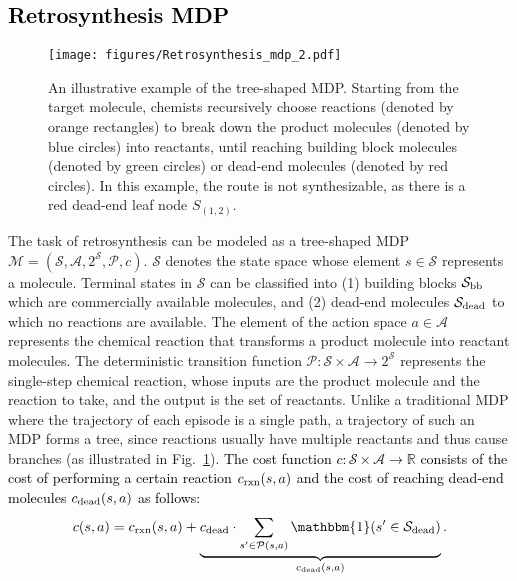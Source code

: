 \documentclass[nohyperref]{article}
\theoremstyle{plain}
\theoremstyle{definition}
\theoremstyle{remark}
\begin{document}
\subsection{\textcolor{black}{Retrosynthesis MDP}}\label{sec:formulation}





\begin{figure}[t]
\centerline{\texttt{[image: figures/Retrosynthesis\_mdp\_2.pdf]}}
\caption{
An illustrative example of the tree-shaped MDP. 
Starting from the target molecule, chemists recursively choose reactions (denoted by orange rectangles) to break down the product molecules (denoted by blue circles) into reactants, until reaching building block molecules (denoted by green circles) or dead-end molecules (denoted by red circles).
In this example, the route is not synthesizable, as there is a red dead-end leaf node $S_{(1,2)}$. 
}
\label{fig:mdp}
\end{figure}


The task of retrosynthesis can be modeled as a 
tree-shaped MDP $\mathcal{M} = (\mathcal{S}, \mathcal{A}, 2^\mathcal{S}, \mathcal{P}, c)$.
$\mathcal{S}$ denotes the state space whose element $s\in\mathcal{S}$ represents a molecule. Terminal states in $\mathcal{S}$ can be classified into (1) building blocks $\mathcal{S}_{\rm bb}$ which are commercially available molecules, and (2) dead-end molecules $\mathcal{S}_{\rm dead}$ to which no reactions are available. 
The element of the action space $a\in\mathcal{A}$ represents the chemical reaction that transforms a product molecule into reactant molecules. 
The deterministic transition function $\mathcal{P}: \mathcal{S}\times\mathcal{A}\rightarrow 2^\mathcal{S}$ represents the single-step chemical reaction, whose inputs are the product molecule and the reaction to take, and the output is the set of reactants. 
Unlike a traditional MDP 
where the trajectory
of each episode is a single path,
a trajectory of such an MDP forms a tree, since reactions usually have multiple reactants and thus cause branches (as illustrated in Fig.~\ref{fig:mdp}).
\textcolor{black}{The cost function $c: \mathcal{S}\times\mathcal{A}
\rightarrow \mathbb{R}$ consists of the cost of performing a certain reaction $c_{\rm rxn}(s,a)$ and the cost of
reaching dead-end molecules $c_{\rm dead}(s,a)$ as follows:
}
\begin{equation}
c(s,a) = c_{\rm rxn}(s,a) + \underbrace{c_{\rm dead} \cdot \sum_{s' \in \mathcal{P}(s,a)}{ \mathbbm{1}(s' \in \mathcal{S}_{\rm dead})}}_{c_{\rm dead}(s,a)}.
\label{sec3:cost_function}
\end{equation}
\end{document}

